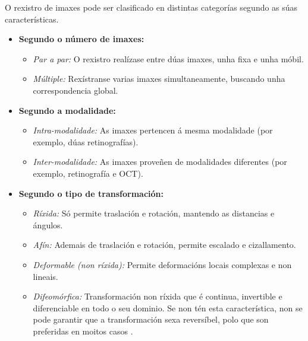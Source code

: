 O rexistro de imaxes pode ser clasificado en distintas categorías segundo as súas características.

\begin{itemize}
    \item \textbf{Segundo o número de imaxes:}
    \begin{itemize}
        \item \textit{Par a par:} O rexistro realízase entre dúas imaxes, unha fixa e unha móbil.
        \item \textit{Múltiple:} Rexístranse varias imaxes simultaneamente, buscando unha correspondencia global.
    \end{itemize}

    \item \textbf{Segundo a modalidade:}
    \begin{itemize}
        \item \textit{Intra-modalidade:} As imaxes pertencen á mesma modalidade (por exemplo, dúas retinografías).
        \item \textit{Inter-modalidade:} As imaxes proveñen de modalidades diferentes (por exemplo, retinografía e OCT).
    \end{itemize}

    \item \textbf{Segundo o tipo de transformación:}
    \begin{itemize}
        \item \textit{Ríxida:} Só permite traslación e rotación, mantendo as distancias e ángulos.
        \item \textit{Afín:} Ademais de traslación e rotación, permite escalado e cizallamento.
        \item \textit{Deformable (non ríxida):} Permite deformacións locais complexas e non lineais.
        \item \textit{Difeomórfica:} Transformación non ríxida que é continua, invertible e diferenciable en todo o seu dominio. Se non tén esta característica, non se pode garantir que a transformación sexa reversíbel, polo que son preferidas en moitos casos \cite{han2022diffeomorphicimageregistrationneural}.
    \end{itemize}


\end{itemize}
